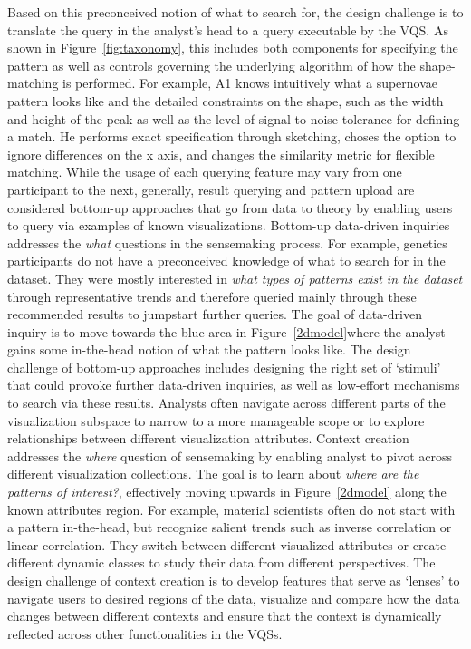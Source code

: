 \par Based on this preconceived notion of what to search for, the design challenge is to translate the query in the analyst's head to a query executable by the VQS. As shown in Figure~\ref{fig:taxonomy}, this includes both components for specifying the pattern as well as controls governing the underlying algorithm of how the shape-matching is performed. For example, A1 knows intuitively what a supernovae pattern looks like and the detailed constraints on the shape, such as the width and height of the peak as well as the level of signal-to-noise tolerance for defining a match. He performs exact specification through sketching, choses the option to ignore differences on the x axis, and changes the similarity metric for flexible matching.  %
 While the usage of each querying feature may vary from one participant to the next, generally, result querying and pattern upload are considered bottom-up approaches that go from data to theory by enabling users to query via examples of known visualizations. Bottom-up data-driven inquiries addresses the \textit{what} questions in the sensemaking process. For example, genetics participants do not have a preconceived knowledge of what to search for in the dataset. They were mostly interested in \textit{what types of patterns exist in the dataset} through representative trends and therefore queried mainly through these recommended results to jumpstart further queries. The goal of data-driven inquiry is to move towards the blue area in Figure~\ref{2dmodel}where the analyst gains some in-the-head notion of what the pattern looks like. The design challenge of bottom-up approaches includes designing the right set of `stimuli' that could provoke further data-driven inquiries, as well as low-effort mechanisms to search via these results.
 Analysts often navigate across different parts of the visualization subspace to narrow to a more manageable scope or to explore relationships between different visualization attributes. Context creation addresses the \textit{where} question of sensemaking by enabling analyst to pivot across different visualization collections. The goal is to learn about \textit{where are the patterns of interest?}, effectively moving upwards in Figure~\ref{2dmodel} along the known attributes region. For example, material scientists often do not start with a pattern in-the-head, but recognize salient trends such as inverse correlation or linear correlation. They switch between different visualized attributes or create different dynamic classes to study their data from different perspectives. The design challenge of context creation is to develop features that serve as `lenses' to navigate users to desired regions of the data, visualize and compare how the data changes between different contexts and ensure that the context is dynamically reflected across other functionalities in the VQSs.
